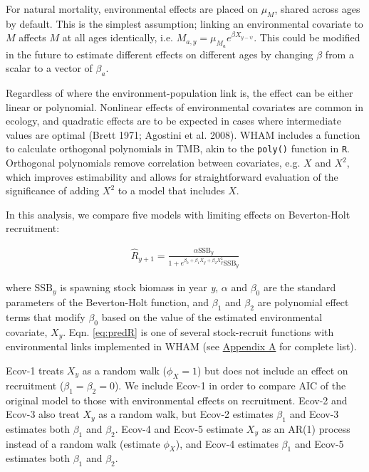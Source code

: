 \documentclass[]{article}
\begin{document}
For natural mortality, environmental effects are placed on \(\mu_M\),
shared across ages by default. This is the simplest assumption; linking
an environmental covariate to \(M\) affects \(M\) at all ages
identically, i.e. \(M_{a,y} = \mu_{M_a} e^{\beta X_{y-\psi}}\). This
could be modified in the future to estimate different effects on
different ages by changing \(\beta\) from a scalar to a vector of
\(\beta_a\).

Regardless of where the environment-population link is, the effect can
be either linear or polynomial. Nonlinear effects of environmental
covariates are common in ecology, and quadratic effects are to be
expected in cases where intermediate values are optimal (Brett 1971;
Agostini et al. 2008). WHAM includes a function to calculate orthogonal
polynomials in TMB, akin to the \texttt{poly()} function in \texttt{R}.
Orthogonal polynomials remove correlation between covariates, e.g. \(X\)
and \(X^2\), which improves estimability and allows for straightforward
evaluation of the significance of adding \(X^2\) to a model that
includes \(X\).

In this analysis, we compare five models with limiting effects on
Beverton-Holt recruitment:

\begin{equation}
\label{eq:predR}
  \begin{array}{ccc}
    \hat{R}_{y+1} = \frac{\alpha \text{SSB}_{y}}{1 + e^{\beta_0 + \beta_1 X_{y} + \beta_2 X^2_{y}} \text{SSB}_y}
  \end{array}
\end{equation}

where \(\text{SSB}_y\) is spawning stock biomass in year \emph{y},
\(\alpha\) and \(\beta_0\) are the standard parameters of the
Beverton-Holt function, and \(\beta_1\) and \(\beta_2\) are polynomial
effect terms that modify \(\beta_0\) based on the value of the estimated
environmental covariate, \(X_y\). Eqn. \ref{eq:predR} is one of several
stock-recruit functions with environmental links implemented in WHAM
(see \protect\hyperlink{appendix-a}{Appendix A} for complete list).

Ecov-1 treats \(X_y\) as a random walk (\(\phi_X = 1\)) but does not
include an effect on recruitment (\(\beta_1 = \beta_2 = 0\)). We include
Ecov-1 in order to compare AIC of the original model to those with
environmental effects on recruitment. Ecov-2 and Ecov-3 also treat
\(X_y\) as a random walk, but Ecov-2 estimates \(\beta_1\) and Ecov-3
estimates both \(\beta_1\) and \(\beta_2\). Ecov-4 and Ecov-5 estimate
\(X_y\) as an AR(1) process instead of a random walk (estimate
\(\phi_X\)), and Ecov-4 estimates \(\beta_1\) and Ecov-5 estimates both
\(\beta_1\) and \(\beta_2\).
\end{document}

